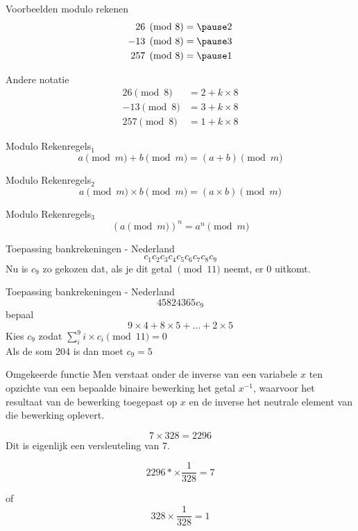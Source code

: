 \documentclass{beamer}
\begin{document}
\begin{frame}{Voorbeelden modulo rekenen}
	\begin{eqnarray}
			26  \pmod{8} &= \pause 2 \\
			-13 \pmod{8} &= \pause 3 \\
			257 \pmod{8} &= \pause 1 
	\end{eqnarray}
\end{frame}

\begin{frame}{Andere notatie}
	\begin{eqnarray}
	26  \pmod{8} &=  2 + k \times 8 \\
	-13 \pmod{8} &= 3 + k \times 8\\
	257 \pmod{8} &=  1 + k \times 8
	\end{eqnarray}
\end{frame}

\begin{frame}{Modulo Rekenregels$_1$}
	\[ a \pmod{m} + b \pmod{m}  =  (a + b)  \pmod{m}\]
\end{frame}

\begin{frame}{Modulo Rekenregels$_2$}
	\[ a \pmod{m} \times b \pmod{m}  =  (a \times b)  \pmod{m}\]
\end{frame}

\begin{frame}{Modulo Rekenregels$_3$}
	\[ (a \pmod{m})^n  =  a^n  \pmod{m}\]
\end{frame}

\begin{frame}{Toepassing bankrekeningen - Nederland}
	\[ c_1c_2c_3c_4c_5c_6c_7c_8c_9\]
	Nu is $c_9$ zo gekozen dat, als je dit getal  $\pmod{11}$ neemt, er 0 uitkomt.
	
\end{frame}

\begin{frame}{Toepassing bankrekeningen - Nederland}
	\[ 45824365c_9\]
	bepaal
	\[ 9 \times 4 + 8 \times 5 + \dots + 2 \times 5 \]
	Kies $c_9$ zodat $\sum_i^9  i \times c_i \pmod{11} = 0$ \\
	Als de som 204 is dan moet $c_9 = 5$ 
	
\end{frame}

\sectionframe

\begin{frame}{Omgekeerde functie}
	Men verstaat onder de inverse van een variabele $x$ ten opzichte van een bepaalde binaire bewerking het getal $x^{-1}$, waarvoor het resultaat van de bewerking toegepast op $x$ en de inverse het neutrale element van die bewerking oplevert.
	
	\[
		7 \times 328 = 2296
	\]
	Dit is eigenlijk een versleuteling van 7.
	
	\[ 
		2296 * \times \frac{1}{328} = 7
	\]
	
	of 
	\[ 
		328 \times \frac{1}{328} = 1
	\]
\end{frame}
\end{document}
